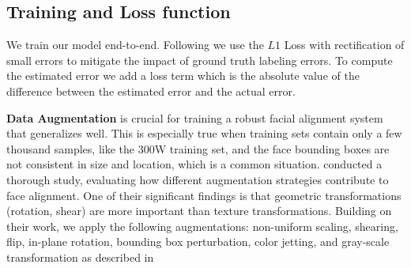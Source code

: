 \documentclass[9pt,twocolumn]{extarticle}
\begin{document}
\subsection{Training and Loss function}

We train our model end-to-end.
Following \cite{feng2019rectified} we use the $L1$ Loss with rectification of small errors to mitigate the impact of ground truth labeling errors. To compute the estimated error we add a loss term which is the absolute value of the difference between the estimated error and the actual error.


\textbf{Data Augmentation} is crucial for training a robust facial alignment system that generalizes well. This is especially true when training sets contain only a few thousand samples, like the 300W training set, and the face bounding boxes are not consistent in size and location, which is a common situation. \cite{ feng2019mining} conducted a thorough study, evaluating how different augmentation strategies contribute to face alignment. One of their significant findings is that geometric transformations (rotation, shear) are more important than texture transformations. Building on their work, we apply the following augmentations: non-uniform scaling, shearing, flip, in-plane rotation, bounding box perturbation, color jetting, and gray-scale transformation as described in \cite{ feng2019mining}

\iffalse
\textbf{Data Augmentation} is crucial for training a robust facial alignment system that generalizes well. This is especially true when training sets contain only a few thousand samples, like the 300W training set, and the face bounding boxes are not consistent in size and location, which is a common situation. \cite{ feng2019mining} conducted a thorough study, evaluating how different augmentation strategies contribute to face alignment. One of their significant findings is that geometric transformations (rotation, shear) are more important than texture transformations. Building on their work, we apply the following augmentations in probability 0.5: scaling factor is uniformly selected between [0.6, 1.4], shearing parameter sampled uniformly from [-0.3, 0.3], flip, in-plane rotation chosen uniformly from [-30, 30]. We also add bounding perturbation, color jetting, and gray-scale transformation as described in \cite{ feng2019mining}
\fi
\end{document}
